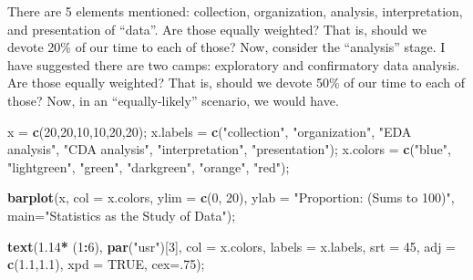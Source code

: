 \documentclass[
]{article}
\newenvironment{Shaded}{\begin{snugshade}}{\end{snugshade}}
\newcommand{\DataTypeTok}[1]{\textcolor[rgb]{0.13,0.29,0.53}{#1}}
\newcommand{\DecValTok}[1]{\textcolor[rgb]{0.00,0.00,0.81}{#1}}
\newcommand{\FloatTok}[1]{\textcolor[rgb]{0.00,0.00,0.81}{#1}}
\newcommand{\KeywordTok}[1]{\textcolor[rgb]{0.13,0.29,0.53}{\textbf{#1}}}
\newcommand{\NormalTok}[1]{#1}
\newcommand{\OperatorTok}[1]{\textcolor[rgb]{0.81,0.36,0.00}{\textbf{#1}}}
\newcommand{\OtherTok}[1]{\textcolor[rgb]{0.56,0.35,0.01}{#1}}
\newcommand{\StringTok}[1]{\textcolor[rgb]{0.31,0.60,0.02}{#1}}
\begin{document}
There are 5 elements mentioned: collection, organization, analysis,
interpretation, and presentation of ``data''. Are those equally
weighted? That is, should we devote 20\% of our time to each of those?
Now, consider the ``analysis'' stage. I have suggested there are two
camps: exploratory and confirmatory data analysis. Are those equally
weighted? That is, should we devote 50\% of our time to each of those?
Now, in an ``equally-likely'' scenario, we would have.

\begin{Shaded}
\begin{Highlighting}[]
\NormalTok{x =}\StringTok{ }\KeywordTok{c}\NormalTok{(}\DecValTok{20}\NormalTok{,}\DecValTok{20}\NormalTok{,}\DecValTok{10}\NormalTok{,}\DecValTok{10}\NormalTok{,}\DecValTok{20}\NormalTok{,}\DecValTok{20}\NormalTok{);}
\NormalTok{x.labels =}\StringTok{ }\KeywordTok{c}\NormalTok{(}\StringTok{"collection"}\NormalTok{, }\StringTok{"organization"}\NormalTok{, }\StringTok{"EDA analysis"}\NormalTok{, }\StringTok{"CDA analysis"}\NormalTok{, }\StringTok{"interpretation"}\NormalTok{, }\StringTok{"presentation"}\NormalTok{);}
\NormalTok{x.colors =}\StringTok{ }\KeywordTok{c}\NormalTok{(}\StringTok{"blue"}\NormalTok{, }\StringTok{"lightgreen"}\NormalTok{, }\StringTok{"green"}\NormalTok{, }\StringTok{"darkgreen"}\NormalTok{, }\StringTok{"orange"}\NormalTok{, }\StringTok{"red"}\NormalTok{);}

\KeywordTok{barplot}\NormalTok{(x, }
        \DataTypeTok{col =}\NormalTok{ x.colors,}
        \DataTypeTok{ylim =} \KeywordTok{c}\NormalTok{(}\DecValTok{0}\NormalTok{, }\DecValTok{20}\NormalTok{),}
        \DataTypeTok{ylab =} \StringTok{"Proportion: (Sums to 100)"}\NormalTok{,}
        \DataTypeTok{main=}\StringTok{"Statistics as the Study of \textquotesingle{}Data\textquotesingle{}"}\NormalTok{);}


\KeywordTok{text}\NormalTok{(}\FloatTok{1.14}\OperatorTok{*}\StringTok{ }\NormalTok{(}\DecValTok{1}\OperatorTok{:}\DecValTok{6}\NormalTok{), }\KeywordTok{par}\NormalTok{(}\StringTok{"usr"}\NormalTok{)[}\DecValTok{3}\NormalTok{], }\DataTypeTok{col =}\NormalTok{ x.colors, }\DataTypeTok{labels =}\NormalTok{ x.labels, }\DataTypeTok{srt =} \DecValTok{45}\NormalTok{, }\DataTypeTok{adj =} \KeywordTok{c}\NormalTok{(}\FloatTok{1.1}\NormalTok{,}\FloatTok{1.1}\NormalTok{), }\DataTypeTok{xpd =} \OtherTok{TRUE}\NormalTok{, }\DataTypeTok{cex=}\NormalTok{.}\DecValTok{75}\NormalTok{);}
\end{Highlighting}
\end{Shaded}
\end{document}
